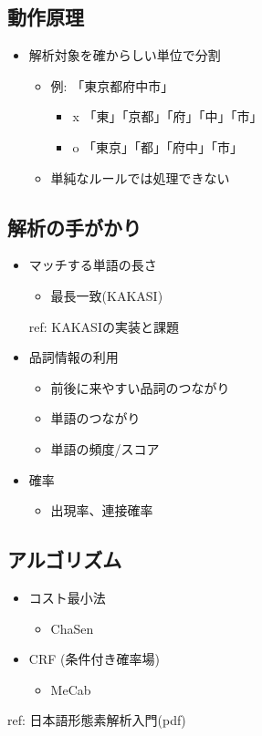 \documentclass[mingoth,a4paper]{jsarticle}
\begin{document}
\subsection{動作原理}

\begin{itemize}
\item 解析対象を確からしい単位で分割
  \begin{itemize}
  \item 例: 「東京都府中市」
    \begin{itemize}
    \item x 「東」「京都」「府」「中」「市」
    \item o 「東京」「都」「府中」「市」
    \end{itemize}
  \item 単純なルールでは処理できない
  \end{itemize}
\end{itemize}

\subsection{解析の手がかり}

\begin{itemize}
\item マッチする単語の長さ
  \begin{itemize}
  \item 最長一致(KAKASI)
  \end{itemize}
  ref: KAKASIの実装と課題
\item 品詞情報の利用
  \begin{itemize}
    \item 前後に来やすい品詞のつながり
    \item  単語のつながり
    \item  単語の頻度/スコア
  \end{itemize}
\item 確率
  \begin{itemize}
  \item 出現率、連接確率
  \end{itemize}
\end{itemize}

\subsection{アルゴリズム}

\begin{itemize}
\item コスト最小法
  \begin{itemize}
  \item ChaSen
  \end{itemize}
\item CRF (条件付き確率場)
  \begin{itemize}
  \item MeCab
  \end{itemize}
\end{itemize}
ref: 日本語形態素解析入門(pdf)
\end{document}
